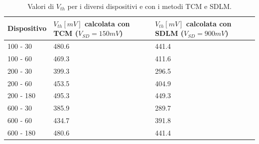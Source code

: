 \documentclass[12pt, letterpaper]{book}
\begin{document}
\begin{table}[H]
  \renewcommand{\arraystretch}{1.3}
  \centering
  \begin{tabular}{m{4.4 cm} m{4.4 cm} m{4.4 cm}}
    \toprule
    Dispositivo & $V_{th} [mV]$ calcolata con TCM ($V_{SD} = 150 mV$) & $V_{th} [mV]$ calcolata con SDLM ($V_{SD} = 900 mV$) \\
    \midrule
    100 - 30    & 480.6                                               & 441.4                                                \\
    \hline
    100 - 60    & 469.3                                               & 411.6                                                \\
    \hline
    200 - 30    & 399.3                                               & 296.5                                                \\
    \hline
    200 - 60    & 453.5                                               & 404.9                                                \\
    \hline
    200 - 180   & 495.3                                               & 449.3                                                \\
    \hline
    600 - 30    & 385.9                                               & 289.7                                                \\
    \hline
    600 - 60    & 434.7                                               & 391.8                                                \\
    \hline
    600 - 180   & 480.6                                               & 441.4                                                \\
    \bottomrule
  \end{tabular}
  \caption{Valori di $V_{th}$ per i diversi dispositivi e con i metodi TCM e SDLM.}
  \label{tab:Iz*}
\end{table}
\end{document}
